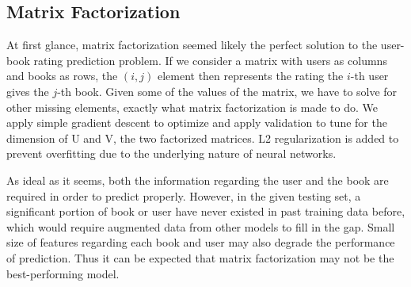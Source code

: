 \documentclass{article}
\begin{document}
\subsection{Matrix Factorization}
At first glance, matrix factorization seemed likely the perfect solution to the user-book rating prediction problem. If we consider a matrix with users as columns and books as rows, the $(i,j)$ element then represents the rating the $i$-th user gives the $j$-th book. Given some of the values of the matrix, we have to solve for other missing elements, exactly what matrix factorization is made to do. We apply simple gradient descent to optimize and apply validation to tune for the dimension of U and V, the two factorized matrices. L2 regularization is added to prevent overfitting due to the underlying nature of neural networks.

As ideal as it seems, both the information regarding the user and the book are required in order to predict properly. However, in the given testing set, a significant portion of book or user have never existed in past training data before, which would require augmented data from other models to fill in the gap. Small size of features regarding each book and user may also degrade the performance of prediction. Thus it can be expected that matrix factorization may not be the best-performing model. 
\end{document}

